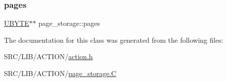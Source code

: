 \mbox{\label{classpage__storage_aaad5bcc49f7452f22d7b6b91375430a3}} 
\subsubsection{\texorpdfstring{pages}{pages}}
{\footnotesize\ttfamily \mbox{\hyperlink{galois_8h_a122c4acf389c050379f00341fdcd5812}{U\+B\+Y\+TE}}$\ast$$\ast$ page\+\_\+storage\+::pages}



The documentation for this class was generated from the following files\+:\begin{DoxyCompactItemize}
\item 
S\+R\+C/\+L\+I\+B/\+A\+C\+T\+I\+O\+N/\mbox{\hyperlink{action_8h}{action.\+h}}\item 
S\+R\+C/\+L\+I\+B/\+A\+C\+T\+I\+O\+N/\mbox{\hyperlink{page__storage_8_c}{page\+\_\+storage.\+C}}\end{DoxyCompactItemize}
